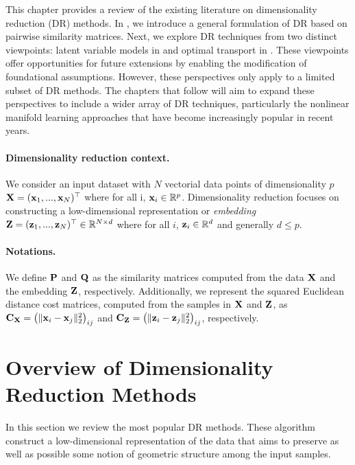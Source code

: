 \newpage

This chapter provides a review of the existing literature on dimensionality reduction (DR) methods. In , we introduce a general formulation of DR based on pairwise similarity matrices. Next, we explore DR techniques from two distinct viewpoints: latent variable models in  and optimal transport in . These viewpoints offer opportunities for future extensions by enabling the modification of foundational assumptions. However, these perspectives only apply to a limited subset of DR methods. The chapters that follow will aim to expand these perspectives to include a wider array of DR techniques, particularly the nonlinear manifold learning approaches that have become increasingly popular in recent years.


\paragraph{Dimensionality reduction context.}
We consider an input dataset with $N$ vectorial data points of dimensionality $p$ \ie ${\mathbf{X}} = ({\mathbf{x}}_1, ..., {\mathbf{x}}_N) ^\top$ where for all i, ${\mathbf{x}}_i \in \mathbb{R}^{p}$. Dimensionality reduction focuses on constructing a low-dimensional representation or \emph{embedding} ${\mathbf{Z}} = ({\mathbf{z}}_1, ..., {\mathbf{z}}_N)^\top \in \mathbb{R}^{N \times d}$ where for all $i$, ${\mathbf{z}}_i \in \mathbb{R}^{d}$ and generally $d \leq p$. 

\paragraph{Notations.} 
We define ${\mathbf{P}}$ and ${\mathbf{Q}}$ as the similarity matrices computed from the data ${\mathbf{X}}$ and the embedding ${\mathbf{Z}}$, respectively. Additionally, we represent the squared Euclidean distance cost matrices, computed from the samples in ${\mathbf{X}}$ and ${\mathbf{Z}}$, as $\mathbf{C}_{\mathbf{X}} = \left(\|{\mathbf{x}}_{i}-{\mathbf{x}}_{j}\|_2^2\right)_{ij}$ and $\mathbf{C}_{\mathbf{Z}} = \left(\|{\mathbf{z}}_{i}-{\mathbf{z}}_{j}\|_2^2\right)_{ij}$, respectively.


\section{Overview of Dimensionality Reduction Methods}\label{sec:background_dr}

In this section we review the most popular DR methods. These algorithm construct a low-dimensional representation of the data that aims to preserve as well as possible some notion of geometric structure among the input samples. 

